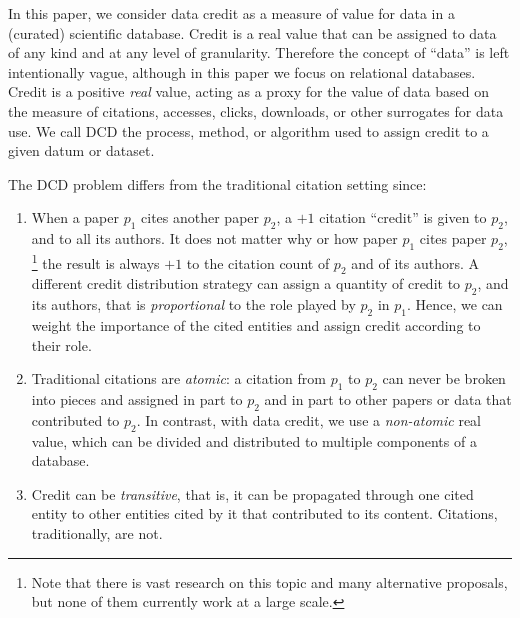In this paper, \textcolor{correction}{we consider data credit as a measure of value for data} in a (curated) scientific database.  
\textcolor{correction}{Credit is a real value that can be assigned} to data of any kind and at any level of granularity. Therefore the concept of ``data'' is left intentionally vague, although in this paper we focus on relational databases.
Credit is a positive \emph{real} value, acting as a proxy for the value of data based on the measure of citations, accesses, clicks, downloads, or other surrogates for data use. We call DCD the process, method, or algorithm used to assign credit to a given datum or dataset.

The DCD problem differs from the traditional citation setting since: 
\begin{enumerate}
    \item \textcolor{correction}{When a paper $p_1$ cites another paper $p_2$, a $+1$ citation ``credit'' is given to $p_2$, and to all its authors. It does not matter why or how paper $p_1$ cites paper $p_2$, \footnote{Note that there is vast research on this topic and many alternative proposals, but none of them currently work at a large scale.} the result is always $+1$ to the citation count of $p_2$ and of its authors. A different credit distribution strategy can assign a quantity of credit to $p_2$, and its authors, that is \emph{proportional} to the role played by $p_2$ in $p_1$. Hence, we can weight the importance of the cited entities and assign credit according to their role.}
    \item \textcolor{correction}{Traditional citations are \emph{atomic}: a citation from $p_1$ to $p_2$ can never be broken into pieces and assigned in part to $p_2$ and in part to other papers or data that contributed to $p_2$. 
	In contrast, with data credit, we use a \emph{non-atomic} real value, which can be divided and distributed to multiple components of a database.} 
	\item Credit can be \emph{transitive}, that is, it can be propagated through one cited entity to other entities cited by it that contributed to its content. Citations, traditionally, are not. 
\end{enumerate}


